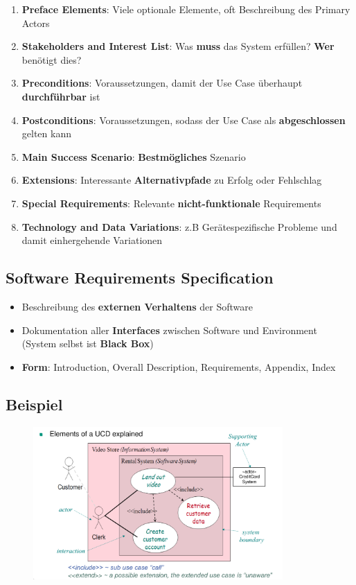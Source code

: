 \begin{enumerate}
	\item \textbf{Preface Elements}: Viele optionale Elemente, oft Beschreibung des Primary Actors
	\item \textbf{Stakeholders and Interest List}: Was \textbf{muss} das System erfüllen? \textbf{Wer} benötigt dies?
	\item \textbf{Preconditions}: Voraussetzungen, damit der Use Case überhaupt \textbf{durchführbar} ist
	\item \textbf{Postconditions}: Voraussetzungen, sodass der Use Case als \textbf{abgeschlossen} gelten kann
	\item \textbf{Main Success Scenario}: \textbf{Bestmögliches} Szenario
	\item \textbf{Extensions}: Interessante \textbf{Alternativpfade} zu Erfolg oder Fehlschlag
	\item \textbf{Special Requirements}: Relevante \textbf{nicht-funktionale} Requirements
	\item \textbf{Technology and Data Variations}: z.B Gerätespezifische Probleme und damit einhergehende Variationen
\end{enumerate}

\subsection{Software Requirements Specification}
\label{uc:sub:software_requirements_specification}

\begin{itemize}
	\item Beschreibung des \textbf{externen Verhaltens} der Software
	\item Dokumentation aller \textbf{Interfaces} zwischen Software und Environment (System selbst ist \textbf{Black Box})
	\item \textbf{Form}: Introduction, Overall Description, Requirements, Appendix, Index
\end{itemize}

\subsection{Beispiel}
\label{uc:sub:beispiel}

\begin{figure}[!h]
	\centering
	\includegraphics[width=0.85\textwidth]{images/usecase.png}
\end{figure}